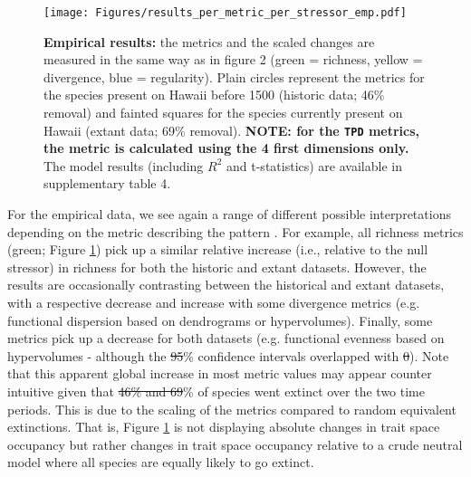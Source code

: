 \documentclass[12pt,letterpaper]{article}
\providecommand{\DIFaddtex}[1]{{\protect\color{blue}\uwave{#1}}} %
\providecommand{\DIFdeltex}[1]{{\protect\color{red}\sout{#1}}}                      %
\providecommand{\DIFaddbegin}{} %
\providecommand{\DIFaddend}{} %
\providecommand{\DIFdelbegin}{} %
\providecommand{\DIFdelend}{} %
\providecommand{\DIFaddbeginFL}{} %
\providecommand{\DIFaddendFL}{} %
\providecommand{\DIFdelbeginFL}{} %
\providecommand{\DIFdelendFL}{} %
\providecommand{\DIFadd}[1]{\texorpdfstring{\DIFaddtex{#1}}{#1}} %
\providecommand{\DIFdel}[1]{\texorpdfstring{\DIFdeltex{#1}}{}} %
\newcommand{\DIFscaledelfig}{0.5}
\newlength{\DIFdelgraphicswidth} %
\newlength{\DIFdelgraphicsheight} %
\newcommand{\DIFaddincludegraphics}[2][]{{\color{blue}\fbox{\DIFOincludegraphics[#1]{#2}}}} %
\newcommand{\DIFdelincludegraphics}[2][]{%
\sbox{\DIFdelgraphicsbox}{\DIFOincludegraphics[#1]{#2}}%
\settoboxwidth{\DIFdelgraphicswidth}{\DIFdelgraphicsbox} %
\settoboxtotalheight{\DIFdelgraphicsheight}{\DIFdelgraphicsbox} %
\scalebox{\DIFscaledelfig}{%
\parbox[b]{\DIFdelgraphicswidth}{\usebox{\DIFdelgraphicsbox}\\[-\baselineskip] \rule{\DIFdelgraphicswidth}{0em}}\llap{\resizebox{\DIFdelgraphicswidth}{\DIFdelgraphicsheight}{%
\setlength{\unitlength}{\DIFdelgraphicswidth}%
\begin{picture}(1,1)%
\thicklines\linethickness{2pt} %
{\color[rgb]{1,0,0}\put(0,0){\framebox(1,1){}}}%
{\color[rgb]{1,0,0}\put(0,0){\line( 1,1){1}}}%
{\color[rgb]{1,0,0}\put(0,1){\line(1,-1){1}}}%
\end{picture}%
}\hspace*{3pt}}} %
} %
\DeclareRobustCommand{\DIFaddbegin}{\DIFOaddbegin \let\includegraphics\DIFaddincludegraphics} %
\DeclareRobustCommand{\DIFaddend}{\DIFOaddend \let\includegraphics\DIFOincludegraphics} %
\DeclareRobustCommand{\DIFdelbegin}{\DIFOdelbegin \let\includegraphics\DIFdelincludegraphics} %
\DeclareRobustCommand{\DIFdelend}{\DIFOaddend \let\includegraphics\DIFOincludegraphics} %
\DeclareRobustCommand{\DIFaddbeginFL}{\DIFOaddbeginFL \let\includegraphics\DIFaddincludegraphics} %
\DeclareRobustCommand{\DIFaddendFL}{\DIFOaddendFL \let\includegraphics\DIFOincludegraphics} %
\DeclareRobustCommand{\DIFdelbeginFL}{\DIFOdelbeginFL \let\includegraphics\DIFdelincludegraphics} %
\DeclareRobustCommand{\DIFdelendFL}{\DIFOaddendFL \let\includegraphics\DIFOincludegraphics} %
\begin{document}
\begin{figure}[!htbp]
\centering
   \texttt{[image: Figures/results\_per\_metric\_per\_stressor\_emp.pdf]}
\caption{\DIFdelbeginFL %
\DIFdelendFL \DIFaddbeginFL \scriptsize{\textbf{Empirical results:} the metrics and the scaled changes are measured in the same way as in figure 2 (green = richness, yellow = divergence, blue = regularity).
Plain circles represent the metrics for the species present on Hawaii before 1500 (historic data; 46\% removal) and fainted squares for the species currently present on Hawaii (extant data; 69\% removal).
\textbf{NOTE: for the \texttt{TPD} metrics, the metric is calculated using the 4 first dimensions only.}
The model results (including $R^{2}$ and t-statistics) are available in supplementary table 4.
}\DIFaddendFL }
\label{Fig:empirical_results}
\end{figure}
\bigskip

For the empirical data, we see again a range of different possible interpretations depending on the metric describing the pattern \DIFaddbegin \DIFadd{(Figure \ref{Fig:empirical_results}, Supplementary table 5)}\DIFaddend .
For example, all richness metrics (green; Figure \ref{Fig:empirical_results}) pick up a similar relative increase (i.e., relative to the null stressor) in richness for both the historic and extant datasets.
However, the results are occasionally contrasting between the historical and extant datasets, with a respective decrease and increase with some divergence metrics (e.g. functional dispersion based on dendrograms or hypervolumes).
Finally, some metrics pick up a decrease for both datasets (e.g. functional evenness based on hypervolumes - although the \DIFdelbegin \DIFdel{95}\DIFdelend \DIFaddbegin \DIFadd{$95$}\DIFaddend \% confidence intervals overlapped with \DIFdelbegin \DIFdel{0}\DIFdelend \DIFaddbegin \DIFadd{$0$}\DIFaddend ).
Note that this apparent global increase in most metric values may appear counter intuitive given that \DIFdelbegin \DIFdel{46\% and 69}\DIFdelend \DIFaddbegin \DIFadd{$46$\% and $69$}\DIFaddend \% of species went extinct over the two time periods.
This is due to the scaling of the metrics compared to random equivalent extinctions.
That is, Figure \ref{Fig:empirical_results} is not displaying absolute changes in trait space occupancy but rather changes in trait space occupancy relative to a crude neutral model where all species are equally likely to go extinct.
\end{document}
